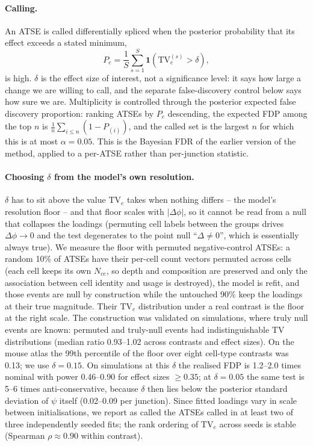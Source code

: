 \paragraph{Calling.} An ATSE is called differentially spliced when the posterior probability that its effect exceeds a stated minimum,
\begin{equation}
    P_e = \frac{1}{S}\sum_{s=1}^S \mathbf{1}\!\left(\mathrm{TV}^{(s)}_e > \delta\right),
\end{equation}
is high. $\delta$ is the effect size of interest, not a significance level: it says how large a change we are willing to call, and the separate false-discovery control below says how sure we are. Multiplicity is controlled through the posterior expected false discovery proportion: ranking ATSEs by $P_e$ descending, the expected FDP among the top $n$ is $\frac{1}{n}\sum_{i\le n}(1-P_{(i)})$, and the called set is the largest $n$ for which this is at most $\alpha = 0.05$. This is the Bayesian FDR of the earlier version of the method, applied to a per-ATSE rather than per-junction statistic.

\paragraph{Choosing $\delta$ from the model's own resolution.} $\delta$ has to sit above the value $\mathrm{TV}_e$ takes when nothing differs -- the model's resolution floor -- and that floor scales with $|\Delta\phi|$, so it cannot be read from a null that collapses the loadings (permuting cell labels between the groups drives $\Delta\phi \to 0$ and the test degenerates to the point null ``$\Delta \ne 0$'', which is essentially always true). We measure the floor with permuted negative-control ATSEs: a random 10\% of ATSEs have their per-cell count vectors permuted across cells (each cell keeps its own $N_{ce}$, so depth and composition are preserved and only the association between cell identity and usage is destroyed), the model is refit, and those events are null by construction while the untouched 90\% keep the loadings at their true magnitude. Their $\mathrm{TV}_e$ distribution under a real contrast is the floor at the right scale. The construction was validated on simulations, where truly null events are known: permuted and truly-null events had indistinguishable $\mathrm{TV}$ distributions (median ratio 0.93--1.02 across contrasts and effect sizes). On the mouse atlas the 99th percentile of the floor over eight cell-type contrasts was 0.13; we use $\delta = 0.15$. On simulations at this $\delta$ the realised FDP is 1.2--2.0 times nominal with power 0.46--0.90 for effect sizes $\ge 0.35$; at $\delta = 0.05$ the same test is 5--6 times anti-conservative, because $\delta$ then lies below the posterior standard deviation of $\psi$ itself (0.02--0.09 per junction). Since fitted loadings vary in scale between initialisations, we report as called the ATSEs called in at least two of three independently seeded fits; the rank ordering of $\mathrm{TV}_e$ across seeds is stable (Spearman $\rho \approx 0.90$ within contrast).

